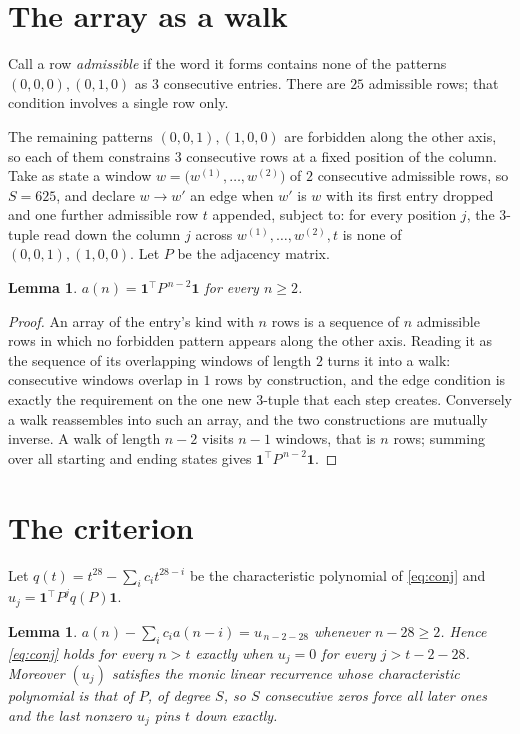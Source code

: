 \documentclass[11pt,a4paper]{article}
\theoremstyle{plain}
\newtheorem{lemma}[theorem]{Lemma}
\theoremstyle{definition}
\begin{document}
\section{The array as a walk}

Call a row \emph{admissible} if the word it forms contains none of the patterns
$(0,0,0), (0,1,0)$ as $3$ consecutive entries. There are $25$ admissible rows; that condition
involves a single row only.

The remaining patterns $(0,0,1), (1,0,0)$ are forbidden along the other axis, so each of them
constrains $3$ consecutive rows at a fixed position of the column. Take as state a
window $w=\bigl(w^{(1)},\dots,w^{(2)}\bigr)$ of $2$ consecutive admissible
rows, so $S=625$, and declare $w\to w'$ an edge when $w'$ is $w$ with its first entry
dropped and one further admissible row $t$ appended, subject to: for every position
$j$, the $3$-tuple read down the column $j$ across $w^{(1)},\dots,w^{(2)},t$
is none of $(0,0,1), (1,0,0)$. Let $P$ be the adjacency matrix.

\begin{lemma}\label{lem:walk}
$a(n)=\mathbf{1}^{\!\top}P^{\,n-2}\mathbf{1}$ for every $n\ge2$.
\end{lemma}

\begin{proof}
An array of the entry's kind with $n$ rows is a sequence of $n$ admissible rows in
which no forbidden pattern appears along the other axis. Reading it as the sequence of its
overlapping windows of length $2$ turns it into a walk: consecutive windows overlap in
$1$ rows by construction, and the edge condition is exactly the requirement on the one
new $3$-tuple that each step creates. Conversely a walk reassembles into such an array,
and the two constructions are mutually inverse. A walk of length $n-2$ visits $n-1$
windows, that is $n$ rows; summing over all starting and ending states gives
$\mathbf{1}^{\!\top}P^{\,n-2}\mathbf{1}$.
\end{proof}

\section{The criterion}

Let $q(t)=t^{28}-\sum_i c_i t^{28-i}$ be the characteristic polynomial of
\eqref{eq:conj} and $u_j=\mathbf{1}^{\!\top}P^{j}q(P)\mathbf{1}$.

\begin{lemma}\label{lem:crit}
$a(n)-\sum_i c_i a(n-i)=u_{\,n-2-28}$ whenever $n-28\ge2$. Hence
\eqref{eq:conj} holds for every $n>t$ exactly when $u_j=0$ for every
$j>t-2-28$. Moreover $(u_j)$ satisfies the monic linear recurrence whose
characteristic polynomial is that of $P$, of degree $S$, so $S$ consecutive zeros force all
later ones and the last nonzero $u_j$ pins $t$ down exactly.
\end{lemma}
\end{document}
